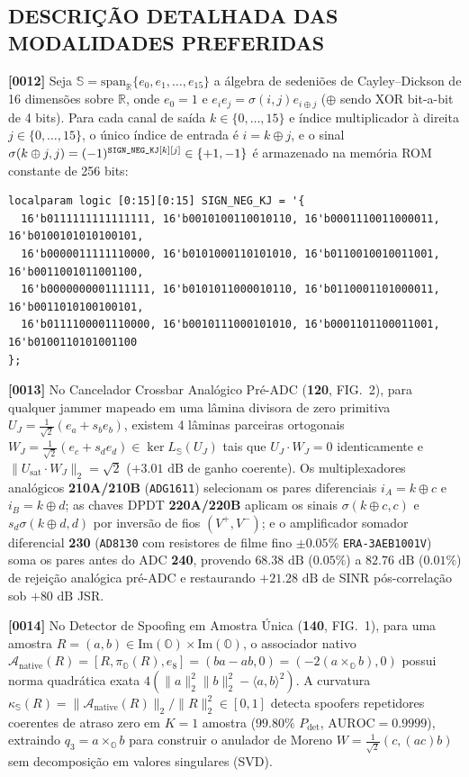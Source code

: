 \documentclass[12pt,a4paper]{article}
\begin{document}
\subsection*{DESCRI\c{C}\~AO DETALHADA DAS MODALIDADES PREFERIDAS}
\textbf{[0012]} Seja $\mathbb{S} = \mathrm{span}_{\mathbb{R}}\{e_0, e_1, \dots, e_{15}\}$ a \'algebra de sedeni\~oes de Cayley--Dickson de 16 dimens\~oes sobre $\mathbb{R}$, onde $e_0 = 1$ e $e_i e_j = \sigma(i, j) e_{i \oplus j}$ ($\oplus$ sendo XOR bit-a-bit de 4 bits). Para cada canal de sa\'ida $k \in \{0,\dots,15\}$ e \'indice multiplicador \`a direita $j \in \{0,\dots,15\}$, o \'unico \'indice de entrada \'e $i = k \oplus j$, e o sinal $\sigma(k \oplus j, j) = (-1)^{\text{\texttt{SIGN\_NEG\_KJ}}[k][j]} \in \{+1, -1\}$ \'e armazenado na mem\'oria ROM constante de 256 bits:
{\footnotesize
\begin{verbatim}
localparam logic [0:15][0:15] SIGN_NEG_KJ = '{
  16'b0111111111111111, 16'b0010100110010110, 16'b0001110011000011, 16'b0100101010100101,
  16'b0000011111110000, 16'b0101000110101010, 16'b0110010010011001, 16'b0011001011001100,
  16'b0000000001111111, 16'b0101011000010110, 16'b0110001101000011, 16'b0011010100100101,
  16'b0111100001110000, 16'b0010111000101010, 16'b0001101100011001, 16'b0100110101001100
};
\end{verbatim}
}

\textbf{[0013]} No Cancelador Crossbar Anal\'ogico Pr\'e-ADC (\textbf{120}, FIG.\ 2), para qualquer jammer mapeado em uma l\^amina divisora de zero primitiva $U_J = \frac{1}{\sqrt{2}}(e_a + s_b e_b)$, existem 4 l\^aminas parceiras ortogonais $W_J = \frac{1}{\sqrt{2}}(e_c + s_d e_d) \in \ker L_{\mathbb{S}}(U_J)$ tais que $U_J \cdot W_J = 0$ identicamente e $\|U_{\mathrm{sat}} \cdot W_J\|_2 = \sqrt{2}$ ($+3.01\text{ dB}$ de ganho coerente). Os multiplexadores anal\'ogicos \textbf{210A/210B} (\texttt{ADG1611}) selecionam os pares diferenciais $i_A = k \oplus c$ e $i_B = k \oplus d$; as chaves DPDT \textbf{220A/220B} aplicam os sinais $\sigma(k \oplus c, c)$ e $s_d \sigma(k \oplus d, d)$ por invers\~ao de fios $(V^+, V^-)$; e o amplificador somador diferencial \textbf{230} (\texttt{AD8130} com resistores de filme fino $\pm 0.05\%$ \texttt{ERA-3AEB1001V}) soma os pares antes do ADC \textbf{240}, provendo $68.38\text{ dB}$ ($0.05\%$) a $82.76\text{ dB}$ ($0.01\%$) de rejei\c{c}\~ao anal\'ogica pr\'e-ADC e restaurando $+21.28\text{ dB}$ de SINR p\'os-correla\c{c}\~ao sob $+80\text{ dB}$ JSR.

\textbf{[0014]} No Detector de Spoofing em Amostra \'Unica (\textbf{140}, FIG.\ 1), para uma amostra $R = (a, b) \in \mathrm{Im}(\mathbb{O}) \times \mathrm{Im}(\mathbb{O})$, o associador nativo $\mathcal{A}_{\mathrm{native}}(R) = [R, \pi_{\mathbb{O}}(R), e_8] = (ba - ab, 0) = (-2(a \times_{\mathbb{O}} b), 0)$ possui norma quadr\'atica exata $4(\|a\|_2^2 \|b\|_2^2 - \langle a, b \rangle^2)$. A curvatura $\kappa_{\mathbb{S}}(R) = \|\mathcal{A}_{\mathrm{native}}(R)\|_2 / \|R\|_2^2 \in [0, 1]$ detecta spoofers repetidores coerentes de atraso zero em $K=1$ amostra ($99.80\%$ $P_{\mathrm{det}}$, $\mathrm{AUROC} = 0.9999$), extraindo $q_3 = a \times_{\mathbb{O}} b$ para construir o anulador de Moreno $W = \frac{1}{\sqrt{2}}(c, (ac)b)$ sem decomposi\c{c}\~ao em valores singulares (SVD).
\end{document}
